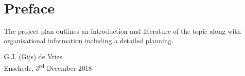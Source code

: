 \chapter*{Preface}

\vskip-10pt
The project plan outlines an introduction and literature of the topic along with organisational information including a detailed planning.

\vskip50pt
G.J. (Gijs) de Vries\\
Enschede, 3\textsuperscript{rd} December 2018
